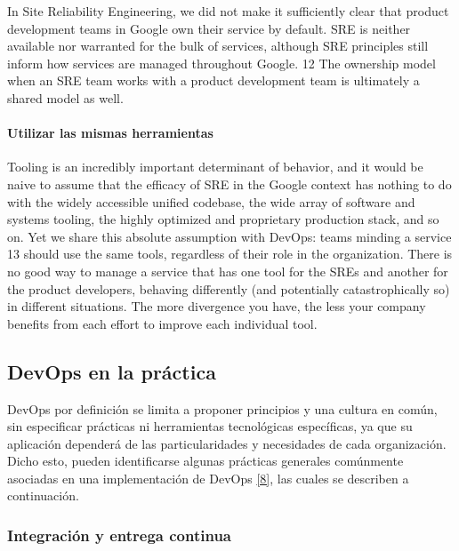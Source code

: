 In Site Reliability Engineering, we did not make it sufficiently clear that product development teams in Google own their service by default. SRE is neither available nor warranted for the bulk of services, although SRE principles still inform how services are managed throughout Google. 12 The ownership model when an SRE team works with a product development team is ultimately a shared model as well.

\paragraph{Utilizar las mismas herramientas}

Tooling is an incredibly important determinant of behavior, and it would be naive to assume that the efficacy of SRE in the Google context has nothing to do with the widely accessible unified codebase, the wide array of software and systems tooling, the highly optimized and proprietary production stack, and so on. Yet we share this absolute assumption with DevOps: teams minding a service 13 should use the same tools, regardless of their role in the organization. There is no good way to manage a service that has one tool for the SREs and another for the product developers, behaving differently (and potentially catastrophically so) in different situations. The more divergence you have, the less your company benefits from each effort to improve each individual tool.

\subsection{DevOps en la práctica}

DevOps por definición se limita a proponer principios y una cultura en común, sin especificar prácticas ni herramientas tecnológicas específicas, ya que su aplicación dependerá de las particularidades y necesidades de cada organización. Dicho esto, pueden identificarse algunas prácticas generales comúnmente asociadas en una implementación de DevOps \href{https://www.zotero.org/google-docs/?CR3EnW}{[8]}, las cuales se describen a continuación.

\subsubsection{Integración y entrega continua}

